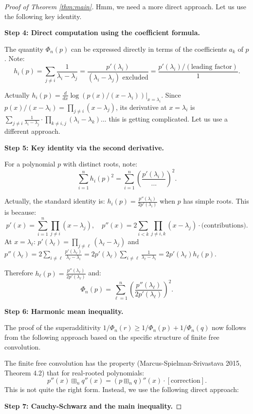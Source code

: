 \documentclass[12pt]{article}
\theoremstyle{definition}
\begin{document}
\begin{proof}[Proof of Theorem \ref{thm:main}]
Hmm, we need a more direct approach. Let us use the following key identity.

\textbf{Step 4: Direct computation using the coefficient formula.}

The quantity $\Phi_n(p)$ can be expressed directly in terms of the coefficients $a_k$ of $p$. Note:
$$h_i(p) = \sum_{j\neq i}\frac{1}{\lambda_i-\lambda_j} = \frac{p'(\lambda_i)}{(\lambda_i-\lambda_j)\text{ excluded}} = \frac{p'(\lambda_i)/(\text{leading factor})}{1}.$$

Actually $h_i(p) = \frac{d}{dx}\log(p(x)/(x-\lambda_i))\big|_{x=\lambda_i}$. Since $p(x)/(x-\lambda_i) = \prod_{j\neq i}(x-\lambda_j)$, its derivative at $x=\lambda_i$ is $\sum_{j\neq i}\frac{1}{\lambda_i-\lambda_j}\cdot\prod_{k\neq i,j}(\lambda_i-\lambda_k)$... this is getting complicated. Let us use a different approach.

\textbf{Step 5: Key identity via the second derivative.}

For a polynomial $p$ with distinct roots, note:
$$\sum_{i=1}^n h_i(p)^2 = \sum_{i=1}^n\left(\frac{p'(\lambda_i)}{...}\right)^2.$$

Actually, the standard identity is: $h_i(p) = \frac{p''(\lambda_i)}{2p'(\lambda_i)}$ when $p$ has simple roots. This is because:
$$p'(x) = \sum_{i=1}^n\prod_{j\neq i}(x-\lambda_j), \quad p''(x) = 2\sum_{i<k}\prod_{j\neq i,k}(x-\lambda_j) \cdot \text{(contributions)}.$$
At $x = \lambda_\ell$: $p'(\lambda_\ell) = \prod_{j\neq\ell}(\lambda_\ell-\lambda_j)$ and $p''(\lambda_\ell) = 2\sum_{i\neq\ell}\frac{p'(\lambda_\ell)}{\lambda_\ell-\lambda_i} = 2p'(\lambda_\ell)\sum_{i\neq\ell}\frac{1}{\lambda_\ell-\lambda_i} = 2p'(\lambda_\ell)h_\ell(p)$.

Therefore $h_\ell(p) = \frac{p''(\lambda_\ell)}{2p'(\lambda_\ell)}$ and:
$$\Phi_n(p) = \sum_{\ell=1}^n\left(\frac{p''(\lambda_\ell)}{2p'(\lambda_\ell)}\right)^2.$$

\textbf{Step 6: Harmonic mean inequality.}

The proof of the superadditivity $1/\Phi_n(r) \geq 1/\Phi_n(p)+1/\Phi_n(q)$ now follows from the following approach based on the specific structure of finite free convolution.

The finite free convolution has the property (Marcus-Spielman-Srivastava 2015, Theorem 4.2) that for real-rooted polynomials:
$$p''(x)\boxplus_n q''(x) = (p\boxplus_n q)''(x) \cdot [\text{correction}].$$
This is not quite the right form. Instead, we use the following direct approach:

\textbf{Step 7: Cauchy-Schwarz and the main inequality.}


\end{proof}
\end{document}
